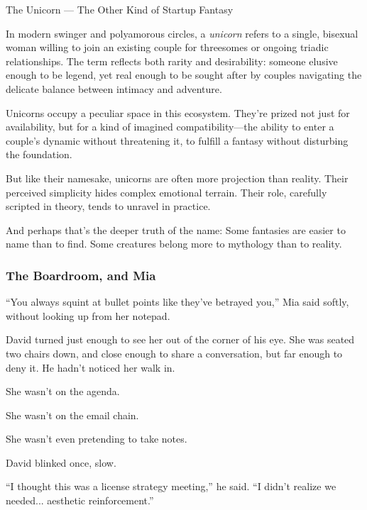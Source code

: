 \begin{HistoricalSidebar}{The Unicorn --- The Other Kind of Startup Fantasy}

  In modern swinger and polyamorous circles, a \textit{unicorn} refers to a single, bisexual woman willing to join an existing 
  couple for threesomes or ongoing triadic relationships. The term reflects both rarity and desirability: someone elusive enough 
  to be legend, yet real enough to be sought after by couples navigating the delicate balance between intimacy and adventure.

  \medskip
  
  Unicorns occupy a peculiar space in this ecosystem. They’re prized not just for availability, but for a kind of imagined 
  compatibility—the ability to enter a couple’s dynamic without threatening it, to fulfill a fantasy without disturbing the 
  foundation.

  \medskip
  
  But like their namesake, unicorns are often more projection than reality. Their perceived simplicity hides complex emotional 
  terrain. Their role, carefully scripted in theory, tends to unravel in practice.

  \medskip
  
  And perhaps that’s the deeper truth of the name:  
  Some fantasies are easier to name than to find.  
  Some creatures belong more to mythology than to reality.
  
\end{HistoricalSidebar}

\medskip

\subsubsection{The Boardroom, and Mia}

``You always squint at bullet points like they’ve betrayed you,'' Mia said softly, without looking up from her notepad.

David turned just enough to see her out of the corner of his eye. She was seated two chairs down, and close 
enough to share a conversation, but far enough to deny it. He hadn’t noticed her walk in.

She wasn’t on the agenda.

She wasn’t on the email chain.

She wasn’t even pretending to take notes.

David blinked once, slow.

``I thought this was a license strategy meeting,'' he said. ``I didn’t realize we needed... aesthetic reinforcement.''

